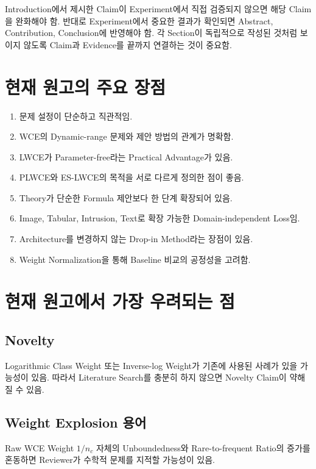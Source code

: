 \documentclass[11pt,a4paper]{article}
\begin{document}
\begin{tcolorbox}[title=핵심 점검]
Introduction에서 제시한 Claim이 Experiment에서 직접 검증되지 않으면 해당 Claim을 완화해야 함. 반대로 Experiment에서 중요한 결과가 확인되면 Abstract, Contribution, Conclusion에 반영해야 함. 각 Section이 독립적으로 작성된 것처럼 보이지 않도록 Claim과 Evidence를 끝까지 연결하는 것이 중요함.
\end{tcolorbox}

\section{현재 원고의 주요 장점}

\begin{enumerate}
\item 문제 설정이 단순하고 직관적임.
\item WCE의 Dynamic-range 문제와 제안 방법의 관계가 명확함.
\item LWCE가 Parameter-free라는 Practical Advantage가 있음.
\item PLWCE와 ES-LWCE의 목적을 서로 다르게 정의한 점이 좋음.
\item Theory가 단순한 Formula 제안보다 한 단계 확장되어 있음.
\item Image, Tabular, Intrusion, Text로 확장 가능한 Domain-independent Loss임.
\item Architecture를 변경하지 않는 Drop-in Method라는 장점이 있음.
\item Weight Normalization을 통해 Baseline 비교의 공정성을 고려함.
\end{enumerate}

\section{현재 원고에서 가장 우려되는 점}

\subsection{Novelty}

Logarithmic Class Weight 또는 Inverse-log Weight가 기존에 사용된 사례가 있을 가능성이 있음. 따라서 Literature Search를 충분히 하지 않으면 Novelty Claim이 약해질 수 있음.

\subsection{Weight Explosion 용어}

Raw WCE Weight \(1/n_c\) 자체의 Unboundedness와 Rare-to-frequent Ratio의 증가를 혼동하면 Reviewer가 수학적 문제를 지적할 가능성이 있음.
\end{document}
